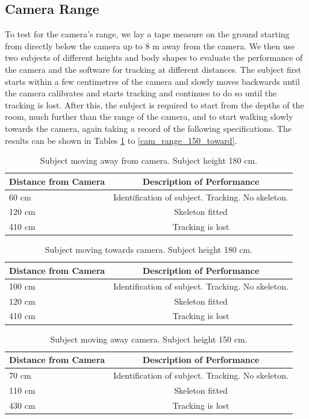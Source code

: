 \documentclass[10pt,a4paper]{article}
\begin{document}
\subsection{Camera Range}
\noindent 
To test for the camera's range, we lay a tape measure on the ground starting from directly below the camera up to 8 m away from the camera. We then use two subjects of different heights and body shapes to evaluate the performance of the camera and the software for tracking at different distances. The subject first starts within a few centimetres of the camera and slowly moves backwards until the camera calibrates and starts tracking and continues to do so until the tracking is lost. After this, the subject is required to start from the depths of the room, much further than the range of the camera, and to start walking slowly towards the camera, again taking a record of the following specifications. The results can be shown in Tables \ref{cam_range_180_away} to \ref{cam_range_150_toward}.
\\
\begin{table}[H]
\center
\begin{tabular}{ | l | c |}
\hline
Distance from Camera & Description of Performance \\
\hline
60 cm & Identification of subject. Tracking. No skeleton.\\
120 cm & Skeleton fitted\\
410 cm & Tracking is lost\\
\hline
\end{tabular}
\caption{Subject moving away from camera. Subject height 180 cm.}
\label{cam_range_180_away}
\end{table}

\begin{table}[H]
\center
\begin{tabular}{ | l | c |}
\hline
Distance from Camera & Description of Performance \\
\hline
100 cm & Identification of subject. Tracking. No skeleton.\\
120 cm & Skeleton fitted\\
410 cm & Tracking is lost\\
\hline
\end{tabular}
\caption{Subject moving towards camera. Subject height 180 cm.}
\label{cam_range_180_toward}
\end{table}

\begin{table}[H]
\center
\begin{tabular}{ | l | c |}
\hline
Distance from Camera & Description of Performance \\
\hline
70 cm & Identification of subject. Tracking. No skeleton.\\
110 cm & Skeleton fitted\\
430 cm & Tracking is lost\\
\hline
\end{tabular}
\caption{Subject moving away camera. Subject height 150 cm.}
\label{cam_range_150_away}
\end{table}
\end{document}
